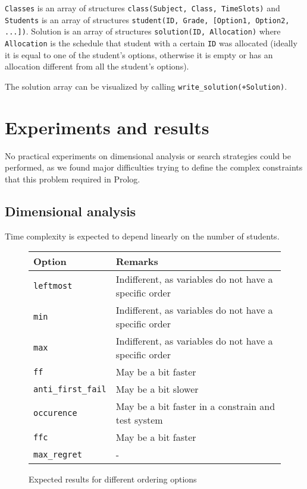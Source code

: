 \documentclass[runningheads]{llncs}
\begin{document}
\texttt{Classes} is an array of structures \texttt{class(Subject, Class, TimeSlots)} and \texttt{Students} is an array of structures \texttt{student(ID, Grade, [Option1, Option2, ...])}. Solution is an array of structures \texttt{solution(ID, Allocation)} where \texttt{Allocation} is the schedule that student with a certain \texttt{ID} was allocated (ideally it is equal to one of the student's options, otherwise it is empty or has an allocation different from all the student's options).

The solution array can be visualized by calling \texttt{write\_solution(+Solution)}.

\section{Experiments and results}

No practical experiments on dimensional analysis or search strategies could be performed, as we found major difficulties trying to define the complex constraints that this problem required in Prolog.

\subsection{Dimensional analysis}

Time complexity is expected to depend linearly on the number of students.

\begin{figure}[!h]
    \centering
    \caption{Expected results for different ordering options}
    \begin{tabular}{l | l}
        \hline
        \textbf{Option}            & \textbf{Remarks}                                       \\ \hline
        \texttt{leftmost}          & Indifferent, as variables do not have a specific order \\
        \texttt{min}               & Indifferent, as variables do not have a specific order \\
        \texttt{max}               & Indifferent, as variables do not have a specific order \\
        \texttt{ff}                & May be a bit faster                                    \\
        \texttt{anti\_first\_fail} & May be a bit slower                                    \\
        \texttt{occurence}         & May be a bit faster in a constrain and test system     \\
        \texttt{ffc}               & May be a bit faster                                    \\
        \texttt{max\_regret}       & - \\ \hline
    \end{tabular}
\end{figure}
\end{document}
